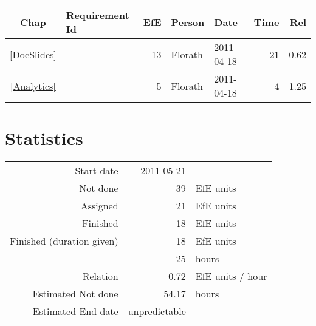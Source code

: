 {\small \begin{longtable}{|c|p{5.5cm}||r|l|l|r|r|} \hline
\textbf{Chap} & \textbf{Requirement Id} & \textbf{EfE} & \textbf{Person} & \textbf{Date} & \textbf{Time} & \textbf{Rel} \\ \hline\endhead
\ref{DocSlides} & \nameref{DocSlides} & 13 & Florath & 2011-04-18 & 21 & 0.62 \\ \hline
\ref{Analytics} & \nameref{Analytics} & 5 & Florath & 2011-04-18 & 4 & 1.25 \\ \hline
\end{longtable}}\section{Statistics}
\begin{longtable}{rrl}
Start date & 2011-05-21 & \\ 
Not done & 39 & EfE units \\ 
Assigned & 21 & EfE units \\ 
Finished & 18 & EfE units \\ 
Finished (duration given) & 18 & EfE units \\ 
 & 25 & hours \\ 
Relation & 0.72 & EfE units / hour \\ 
Estimated Not done & 54.17 & hours \\ 
Estimated End date & unpredictable & \\ 
\end{longtable}